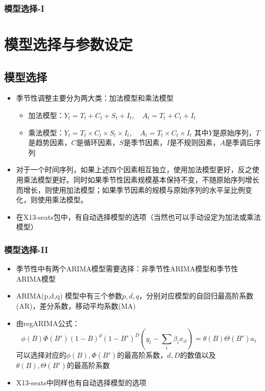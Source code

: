\documentclass{beamer}
\begin{document}
\begin{frame}
\frametitle{模型选择-I}
\section{模型选择与参数设定}
\subsection{模型选择}
\begin{itemize}
\item 季节性调整主要分为两大类：加法模型和乘法模型
\vskip 5pt
\begin{itemize}
\item 加法模型：\(Y_{t}=T_{t}+C_{t}+S_{t}+I_{t}, \quad A_{t}=T_{t}+C_{t}+I_{t}\)
\item 乘法模型：\(Y_{t}=T_{t}\times C_{t}\times S_{t}\times I_{t}, \quad A_{t}=T_{t}\times C_{t}\times I_{t}\)
\vskip 5pt
其中$Y$是原始序列，$T$是趋势因素，$C$是循环因素，$S$是季节因素，$I$是不规则因素，$A$是季调后序列
\end{itemize}
\item 对于一个时间序列，如果上述四个因素相互独立，使用加法模型更好，反之使用乘法模型更好。同时如果季节性因素规模基本保持不变，不随原始序列增长而增长，则使用加法模型；如果季节因素的规模与原始序列的水平呈比例变化，则使用乘法模型。
\item 在X13-seats包中，有自动选择模型的选项（当然也可以手动设定为加法或乘法模型）
\end{itemize}
\end{frame}
\begin{frame}
\frametitle{模型选择-II}
\begin{itemize}
\item 季节性中有两个ARIMA模型需要选择：非季节性ARIMA模型和季节性ARIMA模型
\vskip 5pt
\item ARIMA(p,d,q) 模型中有三个参数$p,d,q$，分别对应模型的自回归最高阶系数(AR)，差分系数，移动平均系数(MA)
\item 由regARIMA公式：\[\phi(B)\Phi(B^{s})(1-B)^{d}(1-B^{s})^{D}(y_{t}-\sum_{i}\beta_{i}x_{it})=\theta(B)\Theta(B^{s})a_{t}\]
可以选择对应的$\phi(B), \Phi(B^{s})$的最高阶系数，$d,D$的数值以及$\theta(B),\Theta(B^{s})$的最高阶系数
\item X13-seats中同样也有自动选择模型的选项
\end{itemize}
\end{frame}
\end{document}
